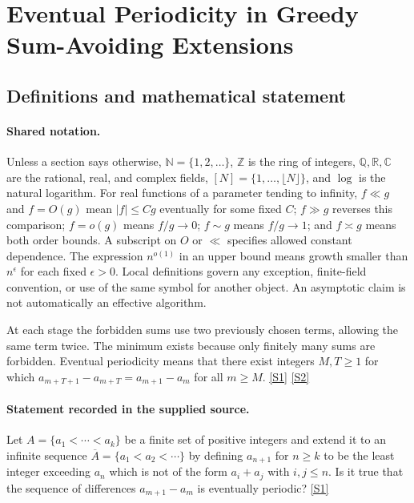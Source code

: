 \documentclass[11pt,a4paper]{article}
\newcommand{\N}{\mathbb{N}}
\newcommand{\Z}{\mathbb{Z}}
\newcommand{\Q}{\mathbb{Q}}
\newcommand{\R}{\mathbb{R}}
\newcommand{\C}{\mathbb{C}}
\newcommand{\sref}[2]{\hyperlink{source:#1:#2}{[S#2]}}
\begin{document}
\section{Eventual Periodicity in Greedy Sum-Avoiding Extensions}\label{statement}


\subsection{Definitions and mathematical statement}

\paragraph{Shared notation.}Unless a section says otherwise, $\N=\{1,2,\ldots\}$,
$\Z$ is the ring of integers, $\Q,\R,\C$ are the rational, real, and complex
fields, $[N]=\{1,\ldots,\lfloor N\rfloor\}$, and $\log$ is the natural
logarithm. For real functions of a parameter tending to infinity,
$f\ll g$ and $f=O(g)$ mean $|f|\leq Cg$ eventually for some fixed $C$;
$f\gg g$ reverses this comparison; $f=o(g)$ means $f/g\to0$;
$f\sim g$ means $f/g\to1$; and $f\asymp g$ means both order bounds.
A subscript on $O$ or $\ll$ specifies allowed constant dependence.
The expression $n^{o(1)}$ in an upper bound means growth smaller than
$n^\epsilon$ for each fixed $\epsilon>0$. Local definitions govern any
exception, finite-field convention, or use of the same symbol for another
object. An asymptotic claim is not automatically an effective algorithm.



At each stage the forbidden sums use two previously chosen terms, allowing the same term twice. The minimum exists because only finitely many sums are forbidden. Eventual periodicity means that there exist integers $M,T\geq1$ for which $a_{m+T+1}-a_{m+T}=a_{m+1}-a_m$ for all $m\geq M$. \sref{statement}{1} \sref{statement}{2}

\paragraph{Statement recorded in the supplied source.}
Let $A=\{a_1<\cdots<a_k\}$ be a finite set of positive integers and extend it to an infinite sequence $\overline{A}=\{a_1<a_2<\cdots \}$ by defining $a_{n+1}$ for $n\geq k$ to be the least integer exceeding $a_n$ which is not of the form $a_i+a_j$ with $i,j\leq n$. Is it true that the sequence of differences $a_{m+1}-a_m$ is eventually periodic? \sref{statement}{1}
\end{document}
